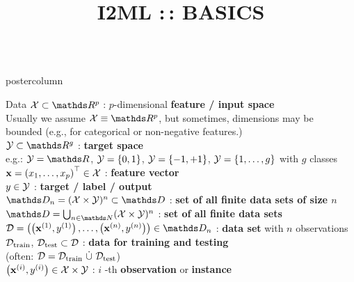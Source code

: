 \documentclass{beamer}
\title{I2ML :\,: BASICS} %
\newlength{\columnheight} %
\begin{document}
\begin{frame}[fragile]{}
\vspace{-8ex}
\begin{columns}
	\begin{column}{.31\textwidth}
		\begin{beamercolorbox}[center]{postercolumn}
			\begin{minipage}{.98\textwidth}
				\parbox[t][\columnheight]{\textwidth}{
\begin{myblock}{Data}
 $\Xspace \subset \R^p$ : $p$-dimensional \textbf{feature / input space}\\ 
Usually we assume $\Xspace \equiv \R^p$, but sometimes, dimensions may be \\  
bounded (e.g., for categorical or non-negative features.)    \\

$\Yspace \subset \R^g$ : \textbf{target space} \\ 
e.g.: $\Yspace = \R$, $\mathcal{Y} = \{0, 1\}$, $\mathcal{Y} = \{-1, +1\}$, $\mathcal{Y} = \{1, \ldots, g\}$ with $g$ classes\\

$\mathbf{x} = \left(x_1, \ldots, x_p\right)^\top \in \mathcal{X}$ : \textbf{feature vector} \\ 
 
$y \in \mathcal{Y}$ : \textbf{target / label / output} \\
 
$\allDatasetsn = \defAllDatasetsn \subset \allDatasets$ : \textbf{set of all finite data sets of size $n$} \\

$\allDatasets = \defAllDatasets$ : \textbf{set of all finite data sets} \\
 
$\D = \Dset \in \allDatasetsn $ : \textbf{data set} with $n$ observations \\
 
$\mathcal{D}_{\text{train}}$, $\mathcal{D}_{\text{test}} \subset \mathcal{D}$ : \textbf{data for training and testing} \\ 
(often: $\mathcal{D} = \mathcal{D}_{\text{train}} ~ \dot{\cup} ~ \mathcal{D}_{\text{test}}$)\\
 
$\left(\mathbf{x}^{(i)}, y^{(i)}\right) \in \mathcal{X}\times \mathcal{Y}$ : $i$ -th \textbf{observation} or \textbf{instance} \\


\end{myblock}}
\end{minipage}
\end{beamercolorbox}
\end{column}
\end{columns}
\end{frame}
\end{document}
